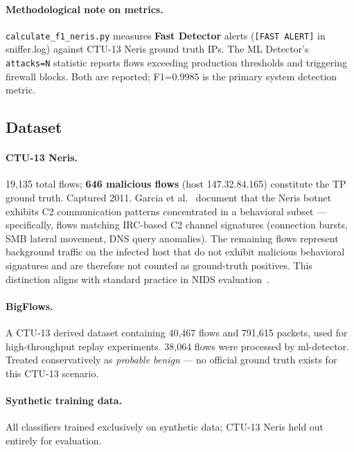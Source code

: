 \documentclass[11pt,a4paper]{article}
\begin{document}
    \paragraph{Methodological note on metrics.}
    \texttt{calculate\_f1\_neris.py} measures \textbf{Fast Detector} alerts
    (\texttt{[FAST ALERT]} in sniffer.log) against CTU-13 Neris ground truth IPs. The ML
    Detector's \texttt{attacks=N} statistic reports flows exceeding production thresholds and
    triggering firewall blocks. Both are reported; F1=0.9985 is the primary system detection
    metric.

    \subsection{Dataset}

    \paragraph{CTU-13 Neris.}
    19,135 total flows; \textbf{646 malicious flows} (host 147.32.84.165) constitute the TP
    ground truth. Captured 2011. Garcia et al.~\cite{garcia2014} document that the Neris botnet
    exhibits C2 communication patterns concentrated in a behavioral subset --- specifically,
    flows matching IRC-based C2 channel signatures (connection bursts, SMB lateral movement, DNS
    query anomalies). The remaining flows represent background traffic on the infected host that
    do not exhibit malicious behavioral signatures and are therefore not counted as ground-truth
    positives. This distinction aligns with standard practice in NIDS
    evaluation~\cite{sharafaldin2018,mirsky2018}.

    \paragraph{BigFlows.}
    A CTU-13 derived dataset containing 40,467 flows and 791,615 packets, used for high-throughput
    replay experiments. 38,064 flows were processed by ml-detector. Treated conservatively as
    \emph{probable benign} --- no official ground truth exists for this CTU-13 scenario.

    \paragraph{Synthetic training data.}
    All classifiers trained exclusively on synthetic data; CTU-13 Neris held out entirely for
    evaluation.
\end{document}
